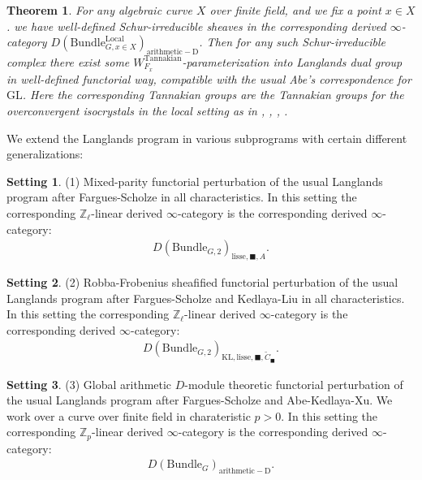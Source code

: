 \documentclass[12pt]{book}
\newtheorem{theorem}{Theorem}
\theoremstyle{definition}
\newtheorem{setting}{Setting}
\begin{document}
\begin{theorem}
For any algebraic curve $X$ over finite field, and we fix a point $x\in X$. we have well-defined Schur-irreducible sheaves in the corresponding derived $\infty$-category $D(\mathrm{Bundle}^\mathrm{Local}_{G,x\in X})_{\mathrm{arithmetic-D}}$. Then for any such Schur-irreducible complex there exist some $W^\mathrm{Tannakian}_{F_x}$-parameterization into Langlands dual group in well-defined functorial way, compatible with the usual Abe's correspondence for $\mathrm{GL}$. Here the corresponding Tannakian groups are the Tannakian groups for the overconvergent isocrystals in the local setting as in \cite{AI}, \cite{KI}, \cite{KXII}, \cite{DK}.
\end{theorem}







We extend the Langlands program in various subprograms with certain different generalizations: 
\begin{setting}
(1) Mixed-parity functorial perturbation of the usual Langlands program after Fargues-Scholze in all characteristics. In this setting the corresponding $\mathbb{Z}_\ell$-linear derived $\infty$-category is the corresponding derived $\infty$-category:
\begin{align}
D(\mathrm{Bundle}_{G,2})_{\text{lisse},\blacksquare,A}.
\end{align}




\end{setting}


\begin{setting}
(2) Robba-Frobenius sheafified functorial perturbation of the usual Langlands program after Fargues-Scholze and Kedlaya-Liu in all characteristics. In this setting the corresponding $\mathbb{Z}_\ell$-linear derived $\infty$-category is the corresponding derived $\infty$-category:
\begin{align}
D(\mathrm{Bundle}_{G,2})_{\text{KL},\mathrm{lisse},\blacksquare,\widetilde{C}_\blacksquare}.
\end{align}



\end{setting}

\begin{setting}
(3) Global arithmetic $D$-module theoretic functorial perturbation of the usual Langlands program after Fargues-Scholze and Abe-Kedlaya-Xu. We work over a curve over finite field in charateristic $p>0$. In this setting the corresponding $\mathbb{Z}_p$-linear derived $\infty$-category is the corresponding derived $\infty$-category:
\begin{align}
D(\mathrm{Bundle}_{G})_{\mathrm{arithmetic-D}}.
\end{align}
 
\end{setting}
\end{document}
